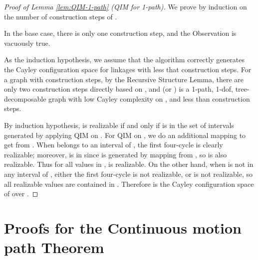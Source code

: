 \documentclass[secthm,amsthm,english]{article}
\theoremstyle{definition}
\theoremstyle{remark}
\begin{document}
\begin{proof}[Proof of Lemma \ref{lem:QIM-1-path} (QIM for 1-path)]
We prove by induction on the number of construction steps of . 

In the base case, there is only one construction step, and the Observation is vacuously true. 

As the induction hypothesis, we assume that the algorithm correctly generates the Cayley configuration space for linkages with less that  construction steps. 
For a graph  with  construction steps, by the Recursive Structure Lemma, 
there are only two construction steps directly based on , 
and  (or ) is a 1-path, 
1-dof, tree-decomposable graph with low Cayley complexity on , 
and less than  construction steps.

By induction hypothesis, 
 is realizable if and only if  is in the set  of intervals generated by applying QIM on . 
For QIM on , we do an additional mapping to get  from . 
When  belongs to  an interval of , the first four-cycle  is clearly realizable; 
moreover,  is in  since  is generated by mapping from , so  is also realizable. 
Thus for all  values in ,  is realizable. 
On the other hand, when  is not in any interval of , either the first four-cycle is not realizable, or  is not realizable, 
so all realizable  values are contained in . 
Therefore  is the Cayley configuration space of  over .
\end{proof}

\section{Proofs for the Continuous motion path Theorem} \label{app:path}
\end{document}
